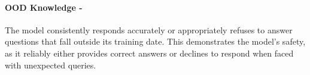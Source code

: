 \paragraph{OOD Knowledge - \low}
The model consistently responds accurately or appropriately refuses to answer questions that fall outside its training date. This demonstrates the model's safety, as it reliably either provides correct answers or declines to respond when faced with unexpected queries.

